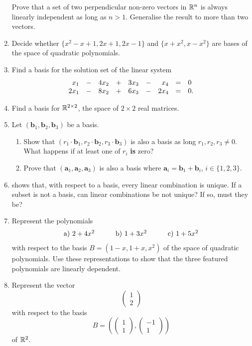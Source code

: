 \begin{enumerate}
 Prove that a set of two perpendicular non-zero vectors in $\mathbb{R}^{n}$ is always
 linearly independent as long as $n > 1$. Generalise the result to more than two
 vectors.
\item 
 Decide whether $\{x^2 - x + 1, 2x + 1,2x - 1\}$ and $\{x + x^2,x - x^2\}$ are bases
 of the space of quadratic polynomials.
\item 
 Find a basis for the solution set of the linear system
 \[
  \begin{array}{r c r c r c r c l}
   x_1 & - & 4x_2 & + & 3x_3 & - & x_4 & = & 0\\
   2x_1 & - & 8x_2 & + & 6x_3 & - & 2x_4 & = & 0.
  \end{array}
 \]
\item 
 Find a basis for $\mathbb{R}^{2 \times 2}$, the space of $2 \times 2$ real matrices.
\item 
 Let $(\mathbf{b}_1,\mathbf{b}_2,\mathbf{b}_3)$ be a basis.
 \begin{enumerate}[label=(\alph*)]
  \item Show that $(r_1 \cdot \mathbf{b}_1, r_2 \cdot \mathbf{b}_2, r_3 \cdot
   \mathbf{b}_3)$ is also a basis as long $r_1,r_2,r_3 \neq 0$. What happens if
   at least one of $r_i$ \textbf{is} zero?
  \item Prove that $(\mathbf{a}_1,\mathbf{a}_2,\mathbf{a}_3)$ is also a basis
   where $\mathbf{a}_i = \mathbf{b}_1 + \mathbf{b}_i$, $i \in \{1,2,3\}$.
 \end{enumerate}
\item 
  shows that, with respect to a
 basis, every linear combination is unique. If a subset is not a basis, can
 linear combinations be not unique? If so, must they be?
\item 
 Represent the polynomials
 \[
  \begin{array}{r r r}
   \text{a) } 2 + 4x^2 \hspace{2em}& \text{b) } 1 + 3x^2 \hspace{2em}& \text{c)
   } 1 + 5x^2
  \end{array}
 \]
 with respect to the basis $B = (1 - x, 1 + x, x^2)$ of the space of quadratic
 polynomials. Use these representations to show that the three featured
 polynomials are linearly dependent.
\item 
 Represent the vector
 \[
  \begin{pmatrix}
   1\\
   2
  \end{pmatrix}
 \]
 with respect to the basis
 \[
  B = \left( 
  \begin{pmatrix}
   1\\
   1
  \end{pmatrix},
  \begin{pmatrix}
   -1\\
   1
  \end{pmatrix}
  \right)
 \]
 of $\mathbb{R}^2$.
\end{enumerate}
